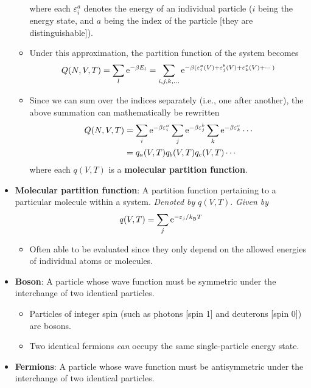\documentclass[../notes.tex]{subfiles}
\begin{document}
\begin{itemize}
\begin{itemize}
\begin{equation*}
        \end{equation*}
        where each $\varepsilon_i^a$ denotes the energy of an individual particle ($i$ being the energy state, and $a$ being the index of the particle [they are distinguishable]).
        \item Under this approximation, the partition function of the system becomes
        \begin{equation*}
            Q(N,V,T) = \sum_l\e[-\beta E_l] = \sum_{i,j,k,\dots}\e[-\beta(\varepsilon_i^a(V)+\varepsilon_j^b(V)+\varepsilon_k^c(V)+\cdots)]
        \end{equation*}
        \item Since we can sum over the indices separately (i.e., one after another), the above summation can mathematically be rewritten
        \begin{align*}
            Q(N,V,T) &= \sum_i\e[-\beta\varepsilon_i^a]\sum_j\e[-\beta\varepsilon_j^b]\sum_k\e[-\beta\varepsilon_k^c]\cdots\\
            &= q_a(V,T)q_b(V,T)q_c(V,T)\cdots
        \end{align*}
        where each $q(V,T)$ is a \textbf{molecular partition function}.
    \end{itemize}
    \item \textbf{Molecular partition function}: A partition function pertaining to a particular molecule within a system. \emph{Denoted by} $q(V,T)$. \emph{Given by}
    \begin{equation*}
        q(V,T) = \sum_j\e[-\varepsilon_j/\kB T]
    \end{equation*}
    \begin{itemize}
        \item Often able to be evaluated since they only depend on the allowed energies of individual atoms or molecules.
    \end{itemize}
    \item \textbf{Boson}: A particle whose wave function must be symmetric under the interchange of two identical particles.
    \begin{itemize}
        \item Particles of integer spin (such as photons [spin 1] and deuterons [spin 0]) are bosons.
        \item Two identical fermions \emph{can} occupy the same single-particle energy state.
    \end{itemize}
    \item \textbf{Fermions}: A particle whose wave function must be antisymmetric under the interchange of two identical particles.

\end{itemize}
\end{document}
